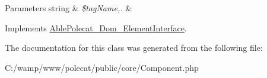 \begin{DoxyParams}[1]{Parameters}
string & {\em \$tag\+Name,.} & \\
\hline
\end{DoxyParams}


Implements \hyperlink{interface_able_polecat___dom___element_interface_aea1e8292a0b88fba2af05b26e503a14c}{Able\+Polecat\+\_\+\+Dom\+\_\+\+Element\+Interface}.



The documentation for this class was generated from the following file\+:\begin{DoxyCompactItemize}
\item 
C\+:/wamp/www/polecat/public/core/Component.\+php\end{DoxyCompactItemize}
